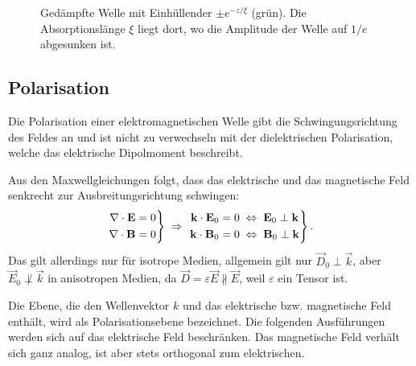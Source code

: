 \begin{figure}[htb]
    \centering
    \tfigDampeningElectromagneticWave
    \caption{Gedämpfte Welle mit Einhüllender $\pm e^{-z/\xi}$ (grün). Die Absorptionslänge $\xi$ liegt dort, wo die Amplitude der Welle auf $1/e$ abgesunken ist. }
    \label{fig:daempfung_em_welle}
\end{figure}


\subsection{Polarisation}

Die Polarisation einer elektromagnetischen Welle gibt die Schwingungsrichtung des Feldes an und ist nicht zu verwechseln mit der dielektrischen Polarisation, welche das elektrische Dipolmoment beschreibt.

Aus den Maxwellgleichungen folgt, dass das elektrische und das magnetische Feld senkrecht zur Ausbreitungsrichtung schwingen:
\begin{align*}
    \left. \begin{aligned} \nabla\cdot \mathbf{E} &=0 \\ \nabla\cdot \mathbf{B} &= 0\end{aligned} \right\} \;\Rightarrow\; \left. \begin{aligned} \mathbf{k}\cdot\mathbf{E}_0&=0\;\Leftrightarrow\; \mathbf{E}_0\perp\mathbf{k} \\ \mathbf{k}\cdot\mathbf{B}_0&=0\;\Leftrightarrow\;\mathbf{B}_0\perp\mathbf{k}\end{aligned}\right\}.
\end{align*}
Das gilt allerdings nur für isotrope Medien, allgemein gilt nur $\vec D_0 \perp\vec k$, aber $\vec E_0 \not\perp\vec k$ in anisotropen Medien, da $\vec D=\varepsilon\vec E \nparallel\vec E$, weil $\varepsilon$ ein Tensor ist.

Die Ebene, die den Wellenvektor $k$ und das elektrische bzw. magnetische Feld enthält, wird als Polarisationsebene bezeichnet.
Die folgenden Ausführungen werden sich auf das elektrische Feld beschränken.
Das magnetische Feld verhält sich ganz analog, ist aber stets orthogonal zum elektrischen.


